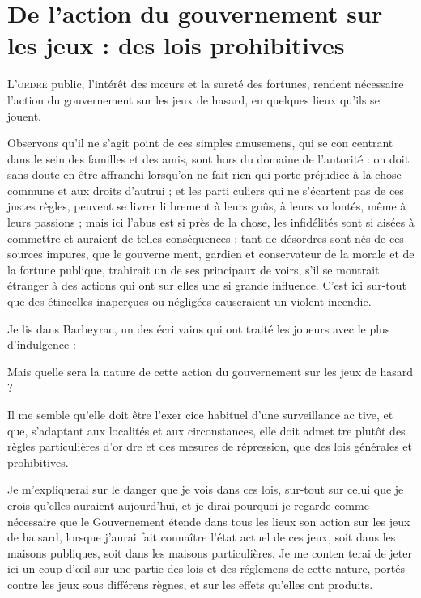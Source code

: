 \chapter
  [De l'action du Gouvernement sur les Jeux. Des lois prohibitives]
  {De l'action du gouvernement sur les jeux : des lois prohibitives}

\lettrine{L}{'ordre} public, l'intérêt des mœurs
et la sureté des fortunes, rendent
nécessaire l'action du gouvernement
sur les jeux de hasard, en quelques
lieux qu'ils se jouent.

Observons qu'il ne s'agit point de
ces simples amusemens, qui se con%
centrant dans le sein des familles et
des amis, sont hors du domaine de
l'autorité : on doit sans doute en être
affranchi lorsqu'on ne fait rien qui
porte préjudice à la chose commune
et aux droits d'autrui ; et les parti%
culiers qui ne s'écartent pas de ces
justes règles, peuvent se livrer li%
brement à leurs goûs, à leurs vo%
lontés, même à leurs passions ; mais
ici l'abus est si près de la chose, les
infidélités sont si aisées à commettre
et auraient de telles conséquences ;
tant de désordres sont nés de ces
sources impures, que le gouverne%
ment, gardien et conservateur de la 
morale et de la fortune publique,
trahirait un de ses principaux de%
voirs, s'il se montrait étranger à des
actions qui ont sur elles une si grande
influence. C'est ici sur-tout que des
étincelles inaperçues ou négligées
causeraient un violent incendie.

Je lis dans Barbeyrac, un des écri%
vains qui ont traité les joueurs avec
le plus d'indulgence : 

Mais quelle sera la nature de cette
action du gouvernement sur les jeux
de hasard ?

Il me semble qu'elle doit être l'exer%
cice habituel d'une surveillance ac%
tive, et que, s'adaptant aux localités
et aux circonstances, elle doit admet%
tre plutôt des règles particulières d'or%
dre et des mesures de répression, que
des lois générales et prohibitives.

Je m'expliquerai sur le danger que
je vois dans ces lois, sur-tout sur
celui que je crois qu'elles auraient
aujourd'hui, et je dirai pourquoi je
regarde comme nécessaire que le
Gouvernement étende dans tous les
lieux son action sur les jeux de ha%
sard, lorsque j'aurai fait connaître
l'état actuel de ces jeux, soit dans
les maisons publiques, soit dans les
maisons particulières. Je me conten%
terai de jeter ici un coup-d'œil sur
une partie des lois et des réglemens
de cette nature, portés contre les jeux
sous différens règnes, et sur les effets
qu'elles ont produits.

